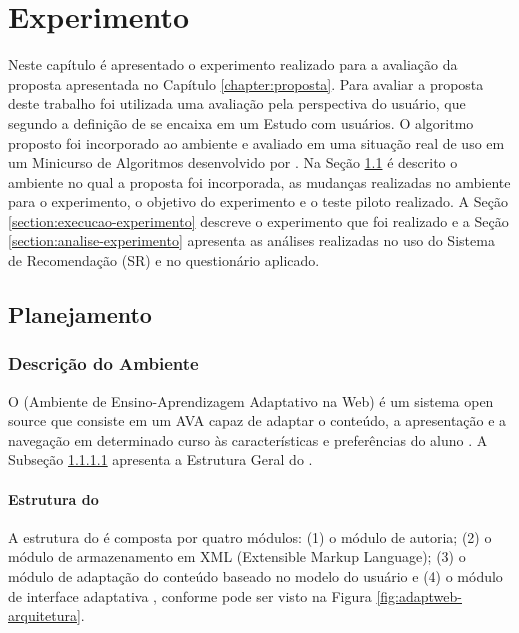 \chapter{Experimento}\label{chapter:experimento}

Neste capítulo é apresentado o experimento realizado para a avaliação da proposta apresentada no Capítulo \ref{chapter:proposta}.
Para avaliar a proposta deste trabalho foi utilizada uma avaliação pela perspectiva do usuário, que segundo a definição de
 se encaixa em um Estudo com usuários. O algoritmo proposto foi incorporado ao ambiente
\adaptwebspace e avaliado em uma situação real de uso em um Minicurso de Algoritmos desenvolvido por .
Na Seção \ref{section:planejamento-experimento} é descrito o ambiente \adaptwebspace no qual a proposta foi incorporada,
as mudanças realizadas no ambiente para o experimento, o objetivo do experimento e o teste piloto realizado. A Seção
\ref{section:execucao-experimento} descreve o experimento que foi realizado e a Seção \ref{section:analise-experimento} apresenta
as análises realizadas no uso do Sistema de Recomendação (SR) e no questionário aplicado.

\section{Planejamento}\label{section:planejamento-experimento}

\subsection{Descrição do Ambiente \adaptweb}

O \adaptwebspace (Ambiente de Ensino-Aprendizagem Adaptativo na Web) é um sistema open source
que consiste em um AVA capaz de adaptar o conteúdo, a apresentação e a navegação em determinado curso às características
e preferências do aluno \cite{gasparini2009adaptweb}. A Subseção \ref{subsection:estrutura-adaptweb} apresenta a Estrutura Geral do
\adaptweb.

\subsubsection{Estrutura do \adaptweb}\label{subsection:estrutura-adaptweb}

A estrutura do \adaptwebspace é composta por quatro módulos: (1) o módulo de autoria; (2) o
módulo de armazenamento em XML (Extensible Markup Language); (3) o módulo de adaptação do conteúdo baseado no modelo do
usuário e (4) o módulo de interface adaptativa \cite{gasparini2003interface}, conforme pode ser visto na Figura
\ref{fig:adaptweb-arquitetura}.

